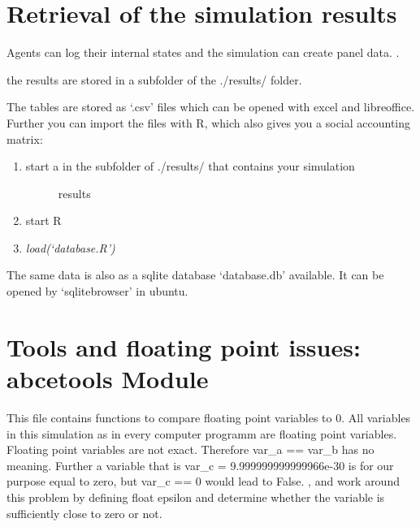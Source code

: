 \documentclass[letterpaper,10pt,english]{sphinxmanual}
\begin{document}
\chapter{Retrieval of the simulation results}
\label{simulation_results:retrieval-of-the-simulation-results}\label{simulation_results::doc}\label{simulation_results:rsr}
Agents can log their internal states and the simulation can create
panel data. .

the results are stored in a subfolder of the ./results/ folder.

The tables are stored as `.csv' files which can be opened with excel and
libreoffice.
Further you can import the files with R, which also gives you a social
accounting matrix:
\begin{enumerate}
\item {} \begin{description}
\item[{start a in the subfolder of ./results/ that contains your simulation}] \leavevmode
results

\end{description}

\item {} 
start R

\item {} 
\emph{load(`database.R')}

\end{enumerate}

The same data is also as a sqlite database `database.db' available.
It can be opened by `sqlitebrowser' in ubuntu.


\chapter{Tools and floating point issues: abcetools Module}
\label{abcetools:tools-and-floating-point-issues-abcetools-module}\label{abcetools::doc}\label{abcetools:module-tools}
This file contains functions to compare floating point variables to 0. All
variables in this simulation as in every computer programm are floating
point variables. Floating point variables are not exact. Therefore var\_a == var\_b
has no meaning. Further a variable that is var\_c = 9.999999999999966e-30 is for our
purpose equal to zero, but var\_c == 0 would lead to False.
{\hyperref[abcetools:tools.is_zero]{}}, {\hyperref[abcetools:tools.is_positive]{}} and {\hyperref[abcetools:tools.is_negative]{}} work
around this problem by defining float epsilon and determine whether the variable is
sufficiently close to zero or not.
\end{document}
